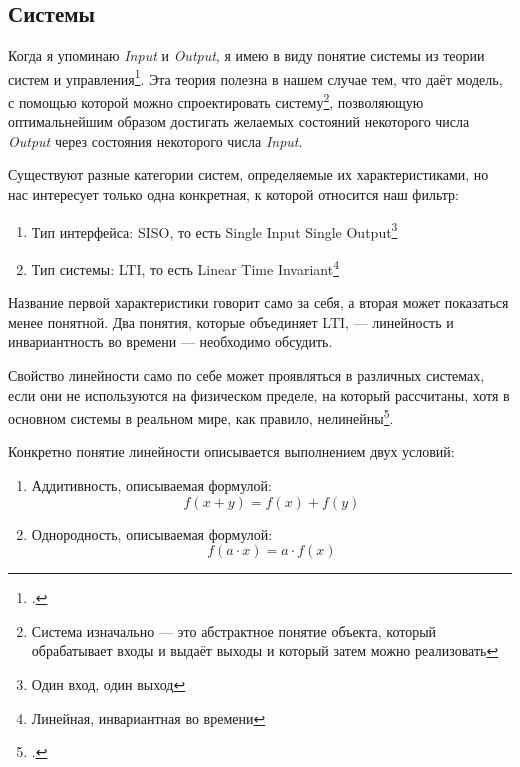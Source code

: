 \documentclass[a4paper, 10pt, final]{article} %
\begin{document}
    \subsection{Системы}\label{sec:FilterTheorySystems}
    Когда я упоминаю \emph{Input} и \emph{Output}, я имею в виду понятие системы из теории систем и управления\footcite[]{ControlTheory:Wiki}.
    Эта теория полезна в нашем случае тем, что даёт модель, с помощью которой можно спроектировать систему\footnote{Система изначально --- это абстрактное понятие объекта, который обрабатывает входы и выдаёт выходы и который затем можно реализовать}, позволяющую оптимальнейшим образом достигать желаемых состояний некоторого числа \emph{Output} через состояния некоторого числа \emph{Input}.

    \begin{samepage}
        \noindent Существуют разные категории систем, определяемые их характеристиками, но нас интересует только одна конкретная, к которой относится наш фильтр:
        \begin{enumerate}[label=\emph{(\arabic*)}]
            \item Тип интерфейса: SISO, то есть Single Input Single Output\footnote{Один вход, один выход}
            \item Тип системы: LTI, то есть Linear Time Invariant\footnote{Линейная, инвариантная во времени}
        \end{enumerate}
    \end{samepage}
    Название первой характеристики говорит само за себя, а вторая может показаться менее понятной.
    Два понятия, которые объединяет LTI, --- линейность и инвариантность во времени --- необходимо обсудить.

    Свойство линейности само по себе может проявляться в различных системах, если они не используются на физическом пределе, на который рассчитаны, хотя в основном системы в реальном мире, как правило, нелинейны\footcite[]{TransferFunction:Wiki}.
    \begin{samepage}
        \noindent Конкретно понятие линейности описывается выполнением двух условий:
        \begin{enumerate}[label=\emph{(\arabic*)}]
            \item Аддитивность, описываемая формулой: \[f(x + y) = f(x) + f(y)\]
            \item Однородность, описываемая формулой: \[f(a \cdot x) = a \cdot f(x)\]
        \end{enumerate}
    \end{samepage}
\end{document}
